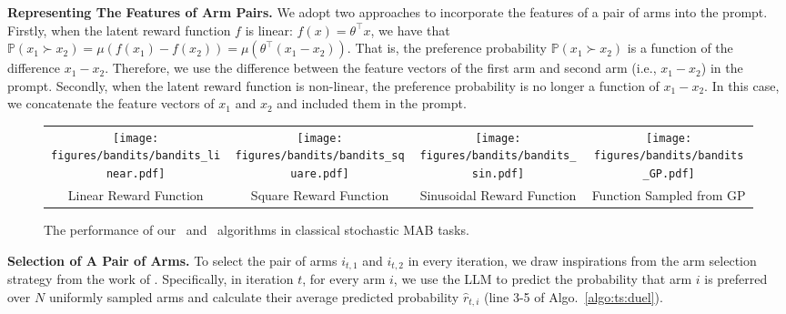 \textbf{Representing The Features of Arm Pairs.}
We adopt two approaches to incorporate the features of a pair of arms into the prompt.
Firstly, when the latent reward function $f$ is linear: $f(x) = \theta^{\top}x$, we have that $\mathbb{P}(x_1 \succ x_2) = \mu(f(x_1) - f(x_2))=\mu\left(\theta^{\top}(x_1 - x_2)\right)$.
That is, the preference probability $\mathbb{P}(x_1 \succ x_2)$ is a function of the difference $x_1 - x_2$.
Therefore, we use the difference between the feature vectors of the first arm and second arm (i.e., $x_1 - x_2$) in the prompt.
Secondly, when the latent reward function is non-linear, the preference probability is no longer a function of $x_1 - x_2$.
In this case, we concatenate the feature vectors of $x_1$ and $x_2$ and included them in the prompt.

\begin{figure*}[t]
     \centering
     \begin{tabular}{cccc}
        \hspace{-5mm}
         \texttt{[image: figures/bandits/bandits\_linear.pdf]} & \hspace{-5.7mm} 
         \texttt{[image: figures/bandits/bandits\_square.pdf]} & \hspace{-5.7mm}
         \texttt{[image: figures/bandits/bandits\_sin.pdf]}& \hspace{-5.7mm}
         \texttt{[image: figures/bandits/bandits\_GP.pdf]}\\
         {\hspace{-3mm}\small  Linear Reward Function} & {\hspace{-3mm}\small  Square Reward Function} & \hspace{-5.7mm}
         {\hspace{-3mm} \small  Sinusoidal Reward Function} & {\hspace{-3mm} \small  Function Sampled from GP}
     \end{tabular}
     \caption{
    The performance of our \algts~and \algro~algorithms in classical stochastic MAB tasks.
     }
    \label{fig:synth:mab}
\end{figure*}
\textbf{Selection of A Pair of Arms.}
To select the pair of arms $i_{t,1}$ and $i_{t,2}$ in every iteration,
we draw inspirations from the arm selection strategy from the work of \citet{verma2024neural}.
Specifically, in iteration $t$, for every arm $i$, we use the LLM to predict the probability that arm $i$ is preferred over $N$ uniformly sampled arms and calculate their average predicted probability $\widehat{r}_{t,i}$ (line 3-5 of Algo.~\ref{algo:ts:duel}).
